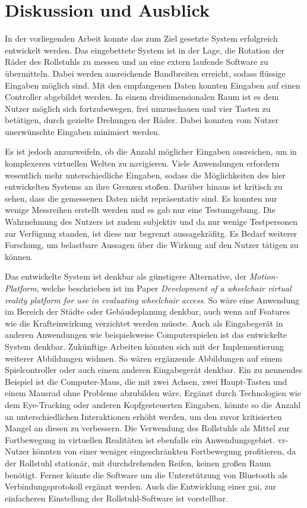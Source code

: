 \chapter{Diskussion und Ausblick}
In der vorliegenden Arbeit konnte das zum Ziel gesetzte System erfolgreich entwickelt werden.
Das eingebettete System ist in der Lage, die Rotation der Räder des Rollstuhls zu messen und an eine extern laufende Software zu übermitteln.
Dabei werden ausreichende Bandbreiten erreicht, sodass flüssige Eingaben möglich sind.
Mit den empfangenen Daten konnten Eingaben auf einen Controller abgebildet werden.
In einem dreidimensionalen Raum ist es dem Nutzer möglich sich fortzubewegen, frei umzuschauen und vier Tasten zu betätigen, durch gezielte Drehungen der Räder.
Dabei konnten vom Nutzer unerwünschte Eingaben minimiert werden.

Es ist jedoch anzuzweifeln, ob die Anzahl möglicher Eingaben ausreichen, um in komplexeren virtuellen Welten zu navigieren.
Viele Anwendungen erfordern wesentlich mehr unterschiedliche Eingaben, sodass die Möglichkeiten des hier entwickelten Systems an ihre Grenzen stoßen.
Darüber hinaus ist kritisch zu sehen, dass die gemessenen Daten nicht repräsentativ sind.
Es konnten nur wenige Messreihen erstellt werden und es gab nur eine Testumgebung.
Die Wahrnehmung des Nutzers ist zudem subjektiv und da nur wenige Testpersonen zur Verfügung standen, ist diese nur begrenzt aussagekräfitg.
Es Bedarf weiterer Forschung, um belastbare Aussagen über die Wirkung auf den Nutzer tätigen zu können.

Das entwickelte System ist denkbar als günstigere Alternative, der \textit{Motion-Platform}, welche beschrieben ist im Paper \textit{Development of a wheelchair virtual reality platform for use in evaluating wheelchair access}\cite{harrisionDevelopmentWheelchairVirtual2000}.
So wäre eine Anwendung im Bereich der Städte oder Gebäudeplanung denkbar, auch wenn auf Features wie die Krafteinwirkung verzichtet werden müsste.
Auch als Eingabegerät in anderen Anwendungen wie beispielsweise Computerspielen ist das entwickelte System denkbar.
Zukünftige Arbeiten könnten sich mit der Implementierung weiterer Abbildungen widmen.
So wären ergänzende Abbildungen auf einem Spielcontroller oder auch einem anderen Eingabegerät denkbar.
Ein zu nennendes Beispiel ist die Computer-Maus, die mit zwei Achsen, zwei Haupt-Tasten und einem Mausrad ohne Probleme abzubilden wäre.
Ergänzt durch Technologien wie dem Eye-Tracking oder anderen Kopfgesteuerten Eingaben, könnte so die Anzahl an unterschiedlichen Interaktionen erhöht werden, um den zuvor kritisierten Mangel an diesen zu verbessern.
Die Verwendung des Rollstuhls als Mittel zur Fortbewegung in virtuellen Realitäten ist ebenfalls ein Anwendungsgebiet.
\ac{vr}-Nutzer könnten von einer weniger eingeschränkten Fortbewegung profitieren, da der Rollstuhl stationär, mit durchdrehenden Reifen, keinen großen Raum benötigt.
Ferner könnte die Software um die Unterstützung von Bluetooth als Verbindungsprotokoll ergänzt werden.
Auch die Entwicklung einer \ac{gui}, zur einfacheren Einstellung der Rollstuhl-Software ist vorstellbar.